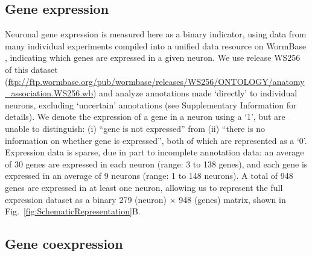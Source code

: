 \documentclass[10pt,letterpaper]{article}
\begin{document}
\subsection*{Gene expression}
Neuronal gene expression is measured here as a binary indicator, using data from many individual experiments compiled into a unified data resource on WormBase \cite{Harris:2009kd}, indicating which genes are expressed in a given neuron.
We use release WS256 of this dataset (\url{ftp://ftp.wormbase.org/pub/wormbase/releases/WS256/ONTOLOGY/anatomy_association.WS256.wb}) and analyze annotations made `directly' to individual neurons, excluding `uncertain' annotations (see Supplementary Information for details).
We denote the expression of a gene in a neuron using a `1', but are unable to distinguish:
(i) ``gene is not expressed'' from
(ii) ``there is no information on whether gene is expressed'', both of which are represented as a `0'.
Expression data is sparse, due in part to incomplete annotation data: an average of 30 genes are expressed in each neuron (range: 3 to 138 genes), and each gene is expressed in an average of 9 neurons (range: 1 to 148 neurons).
A total of 948 genes are expressed in at least one neuron, allowing us to represent the full expression dataset as a binary 279 (neuron) $\times$ 948 (genes) matrix, shown in Fig.~\ref{fig:SchematicRepresentation}B.

\subsection*{Gene coexpression}
\end{document}
